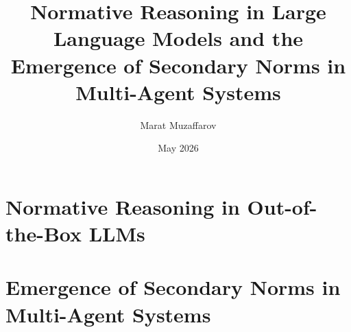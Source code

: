 \documentclass[11pt,letterpaper,oneside]{report}
\title{Normative Reasoning in Large Language Models and the
       Emergence of Secondary Norms in Multi-Agent Systems}
\author{Marat Muzaffarov}
\date{May 2026}
\begin{document}
\maketitle





\part{Normative Reasoning in Out-of-the-Box LLMs}







\part{Emergence of Secondary Norms in Multi-Agent Systems}









\printbibliography
\end{document}
